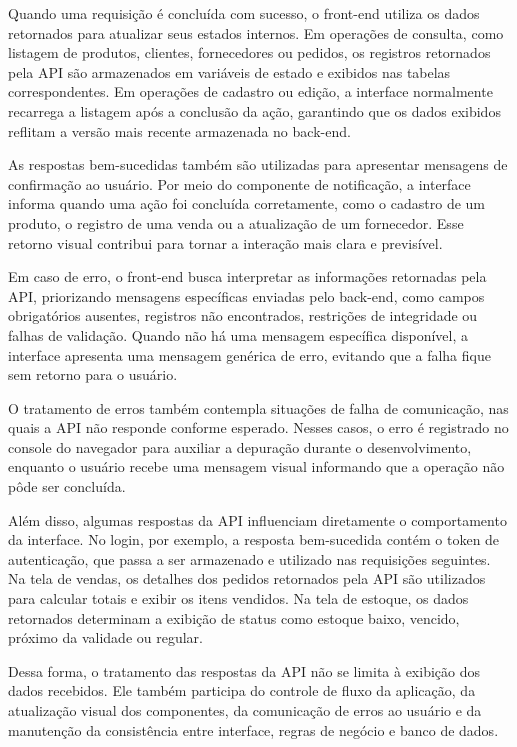 Quando uma requisição é concluída com sucesso, o front-end utiliza os dados retornados para atualizar seus estados internos. Em operações de consulta, como listagem de produtos, clientes, fornecedores ou pedidos, os registros retornados pela API são armazenados em variáveis de estado e exibidos nas tabelas correspondentes. Em operações de cadastro ou edição, a interface normalmente recarrega a listagem após a conclusão da ação, garantindo que os dados exibidos reflitam a versão mais recente armazenada no back-end.

As respostas bem-sucedidas também são utilizadas para apresentar mensagens de confirmação ao usuário. Por meio do componente de notificação, a interface informa quando uma ação foi concluída corretamente, como o cadastro de um produto, o registro de uma venda ou a atualização de um fornecedor. Esse retorno visual contribui para tornar a interação mais clara e previsível.

Em caso de erro, o front-end busca interpretar as informações retornadas pela API, priorizando mensagens específicas enviadas pelo back-end, como campos obrigatórios ausentes, registros não encontrados, restrições de integridade ou falhas de validação. Quando não há uma mensagem específica disponível, a interface apresenta uma mensagem genérica de erro, evitando que a falha fique sem retorno para o usuário.

O tratamento de erros também contempla situações de falha de comunicação, nas quais a API não responde conforme esperado. Nesses casos, o erro é registrado no console do navegador para auxiliar a depuração durante o desenvolvimento, enquanto o usuário recebe uma mensagem visual informando que a operação não pôde ser concluída.

Além disso, algumas respostas da API influenciam diretamente o comportamento da interface. No login, por exemplo, a resposta bem-sucedida contém o token de autenticação, que passa a ser armazenado e utilizado nas requisições seguintes. Na tela de vendas, os detalhes dos pedidos retornados pela API são utilizados para calcular totais e exibir os itens vendidos. Na tela de estoque, os dados retornados determinam a exibição de status como estoque baixo, vencido, próximo da validade ou regular.

Dessa forma, o tratamento das respostas da API não se limita à exibição dos dados recebidos. Ele também participa do controle de fluxo da aplicação, da atualização visual dos componentes, da comunicação de erros ao usuário e da manutenção da consistência entre interface, regras de negócio e banco de dados.

